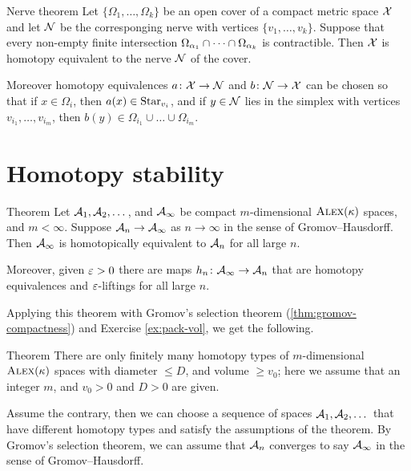 \begin{thm}{Nerve theorem}\label{thm:nerve}
Let $\{\Omega_1,\dots,\Omega_k\}$ be an open cover of a compact metric space $\mathcal{X}$
and let $\mathcal{N}$ be the corresponging nerve with vertices $\{v_1,\dots,v_k\}$.
Suppose that every non-empty finite intersection $\Omega_{\alpha_1}\cap\dots\cap\Omega_{\alpha_k}$ is contractible.
Then $\mathcal{X}$ is homotopy equivalent to the nerve $\mathcal{N}$ of the cover.

Moreover homotopy equivalences  $a\colon\mathcal{X}\to \mathcal{N}$ and $b\colon\mathcal{N}\to\mathcal{X}$ can be chosen so that 
if $x\in \Omega_i$, then $a(x)\in \mathop{\rm Star}\nolimits_{v_i}$,
and if $y\in\mathcal{N}$ lies in the simplex with vertices $v_{i_1},\dots, v_{i_m}$, then $b(y)\in \Omega_{i_1}\cup\dots\cup \Omega_{i_m}$.
\end{thm}




\section{Homotopy stability}

\begin{thm}{Theorem}\label{thm:h-stability}
Let $\mathcal{A}_1,\mathcal{A}_2,\dots$, and $\mathcal{A}_\infty$ be compact $m$-dimensional $\textsc{Alex}(\kappa)$ spaces, and $m<\infty$.
Suppose $\mathcal{A}_n\to \mathcal{A}_\infty$ as $n\to \infty$ in the sense of Gromov--Hausdorff.
Then $\mathcal{A}_\infty$ is homotopically equivalent to $\mathcal{A}_n$ for all large $n$.

Moreover, given $\varepsilon>0$ there are maps $h_n\colon\mathcal{A}_\infty\to \mathcal{A}_n$ that are homotopy equivalences and $\varepsilon$-liftings for all large $n$.
\end{thm}

Applying this theorem with Gromov's selection theorem (\ref{thm:gromov-compactness}) and Exercise \ref{ex:pack-vol}, we get the following.


\begin{thm}{Theorem}\label{thm:h-finiteness}
There are only finitely many homotopy types of $m$-dimensional $\textsc{Alex}(\kappa)$ spaces with diameter $\le D$, and volume $\ge v_0$;
here we assume that an integer $m$, and $v_0>0$ and $D>0$ are given.
\end{thm}

Assume the contrary, then we can choose a sequence of spaces $\mathcal{A}_1,\mathcal{A}_2,\dots$ that have different homotopy types and satisfy the assumptions of the theorem.
By Gromov's selection theorem, we can assume that $\mathcal{A}_n$ converges to say $\mathcal{A}_\infty$ in the sense of Gromov--Hausdorff.

